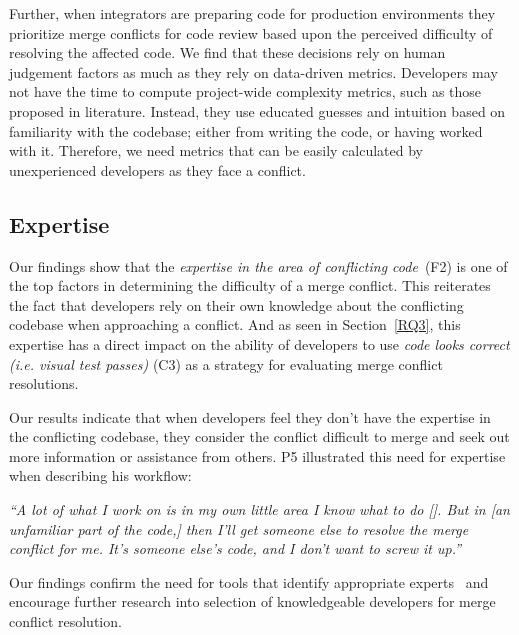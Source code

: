 Further, when integrators are preparing code for production environments they prioritize merge conflicts for code review based upon the perceived difficulty of resolving the affected code.
We find that these decisions rely on human judgement factors as much as they rely on data-driven metrics.
Developers may not have the time to compute project-wide complexity metrics, such as those proposed in literature.
Instead, they use educated guesses and intuition based on familiarity with the codebase; either from writing the code, or having worked with it.
Therefore, we need metrics that can be easily calculated by unexperienced developers as they face a conflict. 

\subsection{Expertise}\label{knowledge-based-factors}

Our findings show that the \textit{expertise in the area of conflicting code}~(F2) is one of the top factors in determining the difficulty of a merge conflict. 
This reiterates the fact that developers rely on their own knowledge about the conflicting codebase when approaching a conflict. 
And as seen in Section~\ref{RQ3}, this expertise has a direct impact on the ability of developers to use \textit{code looks correct (i.e. visual test passes)} (C3) as a strategy for evaluating merge conflict resolutions.

Our results indicate that when developers feel they don't have the expertise in the conflicting codebase, they consider the conflict difficult to merge and seek out more information or assistance from others.
P5 illustrated this need for expertise when describing his workflow: 
\begin{quoting}
	\textit{``A lot of what I work on is in my own little area \textellipsis I know what to do [\textellipsis]. But in [an unfamiliar part of the code,] then I'll get someone else to resolve the merge conflict for me. It's someone else's code, and I don't want to screw it up.''}
\end{quoting}

Our findings confirm the need for tools that identify appropriate experts~\cite{CostaSarma} and encourage further research into selection of knowledgeable developers for merge conflict resolution.


